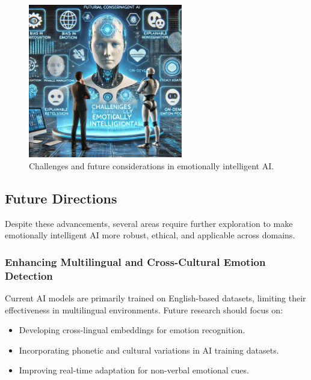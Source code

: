 \documentclass[a4paper,10pt]{article}
\begin{document}
\begin{figure}[h]
    \centering
    \includegraphics[width=0.6\textwidth]{image-13.png}
    \caption{Challenges and future considerations in emotionally intelligent AI.}
    \label{fig:ai_ethics}
\end{figure}

\subsection{Future Directions}
Despite these advancements, several areas require further exploration to make emotionally intelligent AI more robust, ethical, and applicable across domains.

\subsubsection{Enhancing Multilingual and Cross-Cultural Emotion Detection}
Current AI models are primarily trained on English-based datasets, limiting their effectiveness in multilingual environments. Future research should focus on:
\begin{itemize}
    \item Developing cross-lingual embeddings for emotion recognition.
    \item Incorporating phonetic and cultural variations in AI training datasets.
    \item Improving real-time adaptation for non-verbal emotional cues.
\end{itemize}
\end{document}
